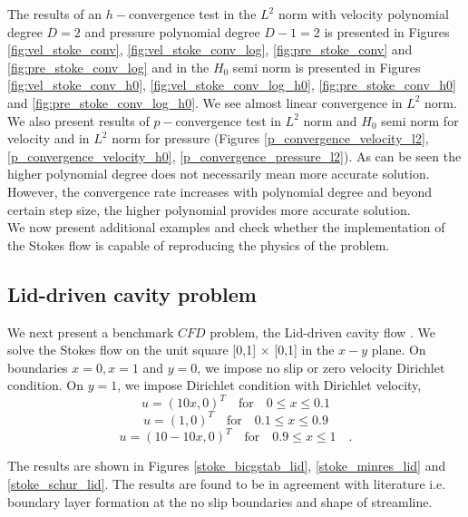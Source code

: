 \documentclass[a4paper,openany]{book}
\begin{document}
The results of an $h-$convergence test in the $L^2$ norm with velocity polynomial degree $D=2$ and pressure polynomial degree $D-1 = 2$ is presented in Figures \ref{fig:vel_stoke_conv}, \ref{fig:vel_stoke_conv_log}, \ref{fig:pre_stoke_conv} and \ref{fig:pre_stoke_conv_log} and in the $H_0$ semi norm is presented in Figures \ref{fig:vel_stoke_conv_h0}, \ref{fig:vel_stoke_conv_log_h0}, \ref{fig:pre_stoke_conv_h0} and \ref{fig:pre_stoke_conv_log_h0}. We see almost linear convergence in $L^2$ norm. \\

We also present results of $p-$convergence test in $L^2$ norm and $H_0$ semi norm for velocity and in $L^2$ norm for pressure (Figures \ref{p_convergence_velocity_l2}, \ref{p_convergence_velocity_h0}, \ref{p_convergence_pressure_l2}). As can be seen the higher polynomial degree does not necessarily mean more accurate solution. However, the convergence rate increases with polynomial degree and beyond certain step size, the higher polynomial provides more accurate solution.\\

We now present additional examples and check whether the implementation of the Stokes flow is capable of reproducing the physics of the problem.

\subsection{Lid-driven cavity problem} \label{lid_driven_cavity_stokes}

We next present a benchmark $CFD$ problem, the Lid-driven cavity flow \cite{Montlaur2}. We solve the Stokes flow on the unit square [0,1] $\times$ [0,1] in the $x-y$ plane. On boundaries ${x = 0}, {x = 1}$ and ${y = 0}$, we impose no slip or zero velocity Dirichlet condition. On ${y = 1}$, we impose Dirichlet condition with Dirichlet velocity,
\begin{equation}
u = (10x,0)^T \quad \textrm{for} \quad 0 \leq x \leq 0.1
\end{equation}
\begin{equation}
u = (1,0)^T \quad \textrm{for} \quad 0.1 \leq x \leq 0.9
\end{equation}
\begin{equation}
u = (10 - 10x,0)^T \quad \textrm{for} \quad 0.9 \leq x \leq 1 \quad \textrm{.}
\end{equation}

The results are shown in Figures \ref{stoke_bicgstab_lid}, \ref{stoke_minres_lid} and \ref{stoke_schur_lid}. The results are found to be in agreement with literature i.e. boundary layer formation at the no slip boundaries and shape of streamline. 
\end{document}
